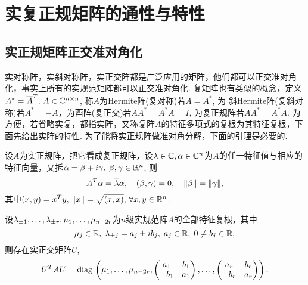 \section{实复正规矩阵的通性与特性}
\subsection{实正规矩阵正交准对角化}
实对称阵，实斜对称阵，实正交阵都是广泛应用的矩阵，他们都可以正交准对角化，事实上所有的实规范矩阵都可以正交准对角化. 复矩阵也有类似的概念，定义$A^*=\overline{A}^T,\, A\in \mathbb{C}^{n\times n}$, 称$A$为Hermite阵(复对称)若$A=A^*$, 为
斜Hermite阵(复斜对称)若$A^*=-A$，为酉阵(复正交)若$AA^*=A^*A=I$, 为复正规阵若$AA^*=A^*A$. 为方便，若省略实复，都指实阵，又称复阵$A$的特征多项式的复根为其特征复根，下面先给出实阵的特性. 为了能将实正规阵做准对角分解，下面的引理是必要的.
\begin{lem}\label{lem:2sob}
	设$A$为实正规阵，把它看成复正规阵，设$\lambda\in\mathbb{C},\alpha\in\mathbb{C}^n$为$A$的任一特征值与相应的特征向量，又拆$\alpha=\beta+i\gamma,\;\beta,\gamma\in \mathbb{R}^n$, 则
	\[A^T\alpha=\overline{\lambda}\alpha,\quad (\beta,\gamma)=0,\quad \|\beta\|=\|\gamma\|,\]
	其中$(x,y)=x^Ty,\,\|x\|=\sqrt{(x,x)},\,\forall x,y\in\mathbb{R}^n$.
\end{lem}
\begin{thm}
	设$\lambda_{\pm 1},\dots,\lambda_{\pm r},\mu_1,\dots,\mu_{n-2r}$为$n$级实规范阵$A$的全部特征复根，其中
	\[\mu_j\in\mathbb{R},\;\lambda_{\pm j}=a_j\pm i b_j,\;a_j\in\mathbb{R},\;0\neq b_j\in \mathbb{R},\]
	则存在实正交矩阵$U$,
	\begin{equation}\label{eq:norm}
	U^T A U=\operatorname*{diag\,}\left(\mu_1,\dots,\mu_{n-2r},
	\begin{pmatrix} a_1 & b_1\\ -b_1 & a_1\end{pmatrix},\dots,\begin{pmatrix} a_r & b_r\\ -b_r & a_r\end{pmatrix}\right).
	\end{equation}
\end{thm}
